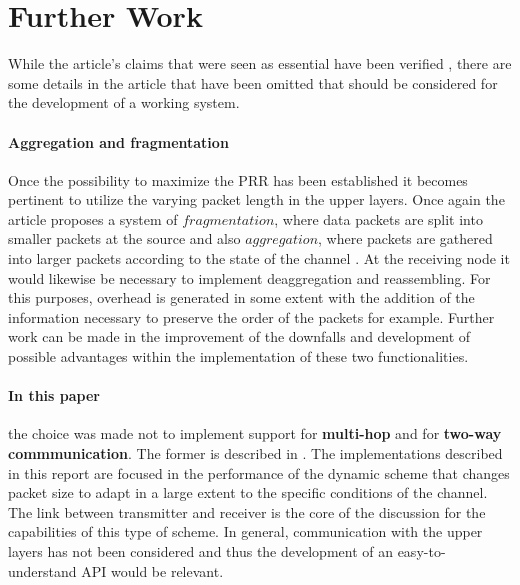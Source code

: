 \section{Further Work}
While the article's claims that were seen as essential have been verified \cite{DPLCpaper}, there are some details in the article that have been omitted that should be considered for the development of a working system.
\paragraph{Aggregation and fragmentation} Once the possibility to maximize the PRR has been established it becomes pertinent to utilize the varying packet length in the upper layers. Once again the article proposes a system of $fragmentation$, where data packets are split into smaller packets at the source and also $aggregation$, where packets are gathered into larger packets according to the state of the channel \cite{DPLCpaper}. At the receiving node it would likewise be necessary to implement deaggregation and reassembling. For this purposes, overhead is generated in some extent with the addition of the information necessary to preserve the order of the packets for example. Further work can be made in the improvement of the downfalls and development of possible advantages within the implementation of these two functionalities.
\paragraph {In this paper} the choice was made not to implement support for \textbf{multi-hop} and for \textbf{two-way commmunication}. The former is described in \cite{DPLCpaper}. The implementations described in this report are focused in the performance of the dynamic scheme that changes packet size to adapt in a large extent to the specific conditions of the channel. The link between transmitter and receiver is the core of the discussion for the capabilities of this type of scheme.
In general, communication with the upper layers has not been considered and thus the development of an easy-to-understand API would be relevant.